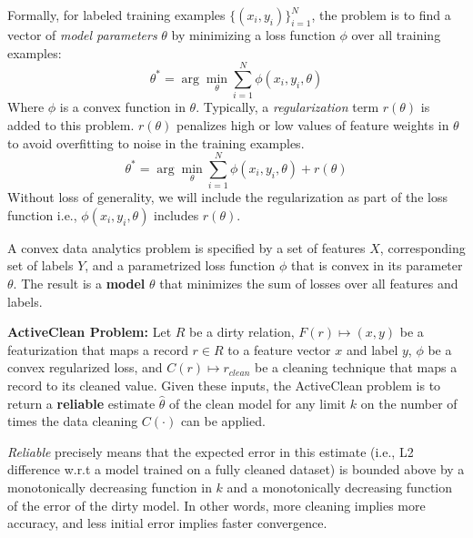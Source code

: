 Formally, for labeled training examples $\{(x_{i},y_{i})\}_{i=1}^{N}$, the problem is to find a vector of \emph{model parameters} $\theta$ by minimizing a loss function $\phi$ over all training examples:
\[
 \theta^{*}=\arg\min_{\theta}\sum_{i=1}^{N}\phi(x_{i},y_{i},\theta)
\]
Where $\phi$ is a convex function in $\theta$.
Typically, a \emph{regularization} term $r(\theta)$ is added to this problem.
$r(\theta)$ penalizes high or low values of feature weights in $\theta$ to avoid overfitting to noise in the training examples.
\[
 \theta^{*}=\arg\min_{\theta}\sum_{i=1}^{N}\phi(x_{i},y_{i},\theta) + r(\theta)
\]
Without loss of generality, we will include the regularization as part of the loss function i.e., $\phi(x_{i},y_{i},\theta)$ includes $r(\theta)$.

\begin{definition}
A convex data analytics problem is specified by a set of features $X$, corresponding set of labels $Y$, and a parametrized loss function $\phi$ that is convex in its parameter $\theta$.
The result is a \textbf{model} $\theta$ that minimizes the sum of losses over all features and labels.
\end{definition}

\vspace{0.5em}
\noindent\textbf{ActiveClean Problem: }\label{activeclean}\sloppy
Let $R$ be a dirty relation, $F(r) \mapsto (x,y)$ be a featurization that maps
a record $r \in R$ to a feature vector $x$ and label $y$, $\phi$ be a convex regularized loss,
and $C(r) \mapsto r_{clean}$ be a cleaning technique that maps a record to its cleaned value. 
Given these inputs, the ActiveClean problem is to return a \textbf{reliable} estimate $\hat{\theta}$ of the clean model for any limit $k$ on the number of times the data cleaning $C(\cdot)$ can be applied.

\vspace{0.25em}

\emph{Reliable} precisely means that the expected error in this estimate (i.e., L2 difference w.r.t a model trained on a fully cleaned dataset) is bounded above by a monotonically decreasing function in $k$ and a monotonically decreasing function of the error of the dirty model. In other words, more cleaning implies more accuracy, and less initial error implies faster convergence.

